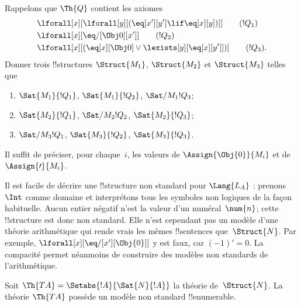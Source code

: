 \documentclass[../../../include/open-logic-section]{subfiles}
\begin{document}
\begin{prob}
Rappelons que $\Th{Q}$ contient les axiomes
\begin{align*}
& \lforall[x][\lforall[y][(\eq[x'][y'] \lif \eq[x][y])]]
  \tag{$!Q_1$}\\
& \lforall[x][\eq/[\Obj 0][x']] \tag{$!Q_2$}\\
& \lforall[x][(\eq[x][\Obj 0]\lor
  \lexists[y][\eq[x][y']])] \tag{$!Q_3$}.
\end{align*}
Donner trois !!{structure}s
$\Struct{M_1}$, $\Struct{M_2}$ et $\Struct{M_3}$
telles que
\begin{enumerate}
\item $\Sat{M_1}{!Q_1}$, $\Sat{M_1}{!Q_2}$,
  $\Sat/{M_1}{!Q_3}$;
\item $\Sat{M_2}{!Q_1}$, $\Sat/{M_2}{!Q_2}$,
  $\Sat{M_2}{!Q_3}$;
\item $\Sat/{M_3}{!Q_1}$, $\Sat{M_3}{!Q_2}$,
  $\Sat{M_3}{!Q_3}$.
\end{enumerate}
Il suffit de préciser, pour chaque~$i$, les valeurs
de $\Assign{\Obj{0}}{M_i}$ et
de~$\Assign{\prime}{M_i}$.
\end{prob}

\begin{explain}
Il est facile de décrire une !!{structure} non standard
pour $\Lang{L_A}$ : prenons $\Int$ comme domaine et
interprétons tous les symboles non logiques de la façon
habituelle. Aucun entier négatif n'est la valeur
d'un numéral~$\num{n}$; cette !!{structure} est donc
non standard. Elle n'est cependant pas un modèle
d'une théorie arithmétique qui rende vrais les
mêmes !!{sentence}s que~$\Struct{N}$.
Par exemple,
$\lforall[x][\eq/[x'][\Obj{0}]]$
y est faux, car $(-1)'=0$. La compacité permet
néanmoins de construire des modèles non standards
de l'arithmétique.
\end{explain}

\begin{prop}
Soit
$\Th{TA}=\Setabs{!A}{\Sat{N}{!A}}$
la théorie de~$\Struct{N}$.
La théorie $\Th{TA}$ possède un modèle non standard
!!{enumerable}.
\end{prop}
\end{document}
